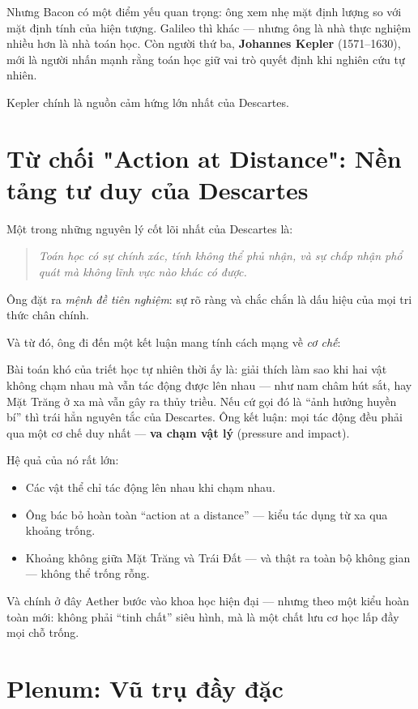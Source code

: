 Nhưng Bacon có một điểm yếu quan trọng: ông xem nhẹ mặt định lượng so với mặt định tính của hiện tượng. Galileo thì khác — nhưng ông là nhà thực nghiệm nhiều hơn là nhà toán học. Còn người thứ ba, \textbf{Johannes Kepler} (1571--1630), mới là người nhấn mạnh rằng toán học giữ vai trò quyết định khi nghiên cứu tự nhiên.

Kepler chính là nguồn cảm hứng lớn nhất của Descartes.


\section{Từ chối "Action at Distance": Nền tảng tư duy của Descartes}

Một trong những nguyên lý cốt lõi nhất của Descartes là:

\begin{quote}
\emph{Toán học có sự chính xác, tính không thể phủ nhận, và sự chấp nhận phổ quát mà không lĩnh vực nào khác có được.}
\end{quote}

Ông đặt ra \emph{mệnh đề tiên nghiệm}: sự rõ ràng và chắc chắn là dấu hiệu của mọi tri thức chân chính.

Và từ đó, ông đi đến một kết luận mang tính cách mạng về \emph{cơ chế}:

Bài toán khó của triết học tự nhiên thời ấy là: giải thích làm sao khi hai vật không chạm nhau mà vẫn tác động được lên nhau — như nam châm hút sắt, hay Mặt Trăng ở xa mà vẫn gây ra thủy triều. Nếu cứ gọi đó là “ảnh hưởng huyền bí” thì trái hẳn nguyên tắc của Descartes. Ông kết luận: mọi tác động đều phải qua một cơ chế duy nhất — \textbf{va chạm vật lý} (pressure and impact).

Hệ quả của nó rất lớn:

\begin{itemize}
  \item Các vật thể chỉ tác động lên nhau khi chạm nhau.
  \item Ông bác bỏ hoàn toàn “action at a distance” — kiểu tác dụng từ xa qua khoảng trống.
  \item Khoảng không giữa Mặt Trăng và Trái Đất — và thật ra toàn bộ không gian — không thể trống rỗng.
\end{itemize}

Và chính ở đây Aether bước vào khoa học hiện đại — nhưng theo một kiểu hoàn toàn mới: không phải “tinh chất” siêu hình, mà là một chất lưu cơ học lấp đầy mọi chỗ trống.


\section{Plenum: Vũ trụ đầy đặc}

